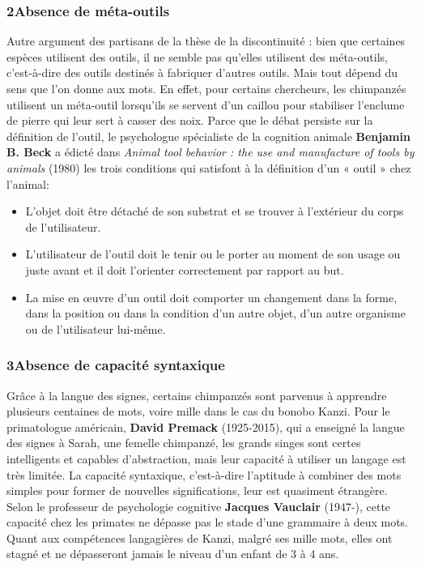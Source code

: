 \subsubsection*{2\quad Absence de méta-outils}
Autre argument des partisans de la thèse de la discontinuité : bien que certaines espèces utilisent des outils, il ne semble pas qu’elles utilisent des méta-outils, c’est-à-dire des outils destinés à fabriquer d’autres outils. Mais tout dépend du sens que l’on donne aux mots. En effet, pour certains chercheurs, les chimpanzés utilisent un méta-outil lorsqu’ils se servent d’un caillou pour stabiliser l’enclume de pierre qui leur sert à casser des noix. Parce que le débat persiste sur la définition de l’outil, le psychologue spécialiste de la cognition animale \textbf{Benjamin B. Beck} a édicté dans \textit{Animal tool behavior : the use and manufacture of tools by animals} (1980) les trois conditions qui satisfont à la définition d’un « outil » chez l’animal:
\begin{itemize}
\item L’objet doit être détaché de son substrat et se trouver à l’extérieur du corps de l’utilisateur.
\item L’utilisateur de l’outil doit le tenir ou le porter au moment de son usage ou juste avant et il doit l’orienter correctement par rapport au but.
\item La mise en œuvre d’un outil doit comporter un changement dans la forme, dans la position ou dans la condition d’un autre objet, d’un autre organisme ou de l’utilisateur lui-même.
\end{itemize}
\subsubsection*{3\quad Absence de capacité syntaxique}
Grâce à la langue des signes, certains chimpanzés sont parvenus à apprendre plusieurs centaines de mots, voire mille dans le cas du bonobo Kanzi. Pour le primatologue américain, \textbf{David Premack} (1925-2015), qui a enseigné la langue des signes à Sarah, une femelle chimpanzé, les grands singes sont certes intelligents et capables d’abstraction, mais leur capacité à utiliser un langage est très limitée. La capacité syntaxique, c’est-à-dire l’aptitude à combiner des mots simples pour former de nouvelles significations, leur est quasiment étrangère. Selon le professeur de psychologie cognitive \textbf{Jacques Vauclair} (1947-), cette capacité chez les primates ne dépasse pas le stade d’une grammaire à deux mots. Quant aux compétences langagières de Kanzi, malgré ses mille mots, elles ont stagné et ne dépasseront jamais le niveau d’un enfant de 3 à 4 ans.

